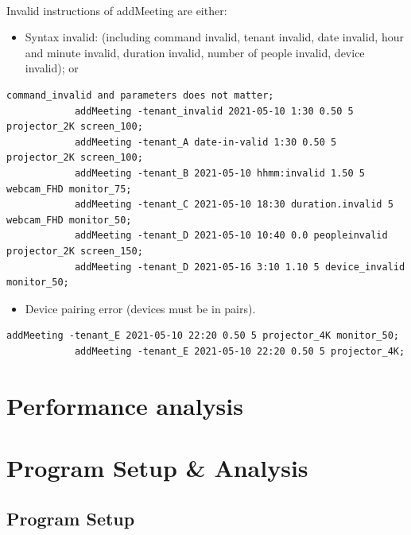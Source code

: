 \documentclass{article}
\begin{document}
        \paragraph{}
        Invalid instructions of addMeeting are either:
        
        \begin{itemize}
        \item Syntax invalid: (including command invalid, tenant invalid, date invalid, hour and minute invalid, duration invalid, number of people invalid, device invalid); or
        \end{itemize}
        
        \begin{Verbatim}[gobble=8]
            command_invalid and parameters does not matter;
            addMeeting -tenant_invalid 2021-05-10 1:30 0.50 5 projector_2K screen_100;
            addMeeting -tenant_A date-in-valid 1:30 0.50 5 projector_2K screen_100;
            addMeeting -tenant_B 2021-05-10 hhmm:invalid 1.50 5 webcam_FHD monitor_75;
            addMeeting -tenant_C 2021-05-10 18:30 duration.invalid 5 webcam_FHD monitor_50;
            addMeeting -tenant_D 2021-05-10 10:40 0.0 peopleinvalid projector_2K screen_150;
            addMeeting -tenant_D 2021-05-16 3:10 1.10 5 device_invalid monitor_50;
        \end{Verbatim}
        \begin{itemize}
        \item Device pairing error (devices must be in pairs).
        \end{itemize}
        \begin{Verbatim}[gobble=8]
            addMeeting -tenant_E 2021-05-10 22:20 0.50 5 projector_4K monitor_50; 
            addMeeting -tenant_E 2021-05-10 22:20 0.50 5 projector_4K; 
        \end{Verbatim}
        

    \cleardoublepage
    \section{Performance analysis}

    \cleardoublepage
    \section{Program Setup \& Analysis}
        \subsection{Program Setup}
\end{document}
